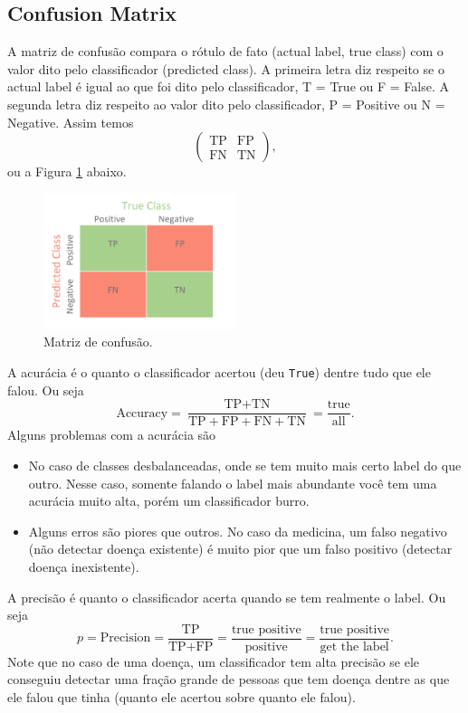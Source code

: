 \documentclass[a4paper,fleqn,12pt]{article}
\begin{document}
\subsection{Confusion Matrix}

A matriz de confusão compara o rótulo de fato (actual label, true class) com o valor dito pelo classificador (predicted class). A primeira letra diz respeito se o actual label é igual ao que foi dito pelo classificador, T = True ou F = False. A segunda letra diz respeito ao valor dito pelo classificador, P = Positive ou N = Negative. Assim temos
$$
\begin{pmatrix}
\text{TP} & \text{FP} \\
\text{FN} & \text{TN}
\end{pmatrix},
$$
ou a Figura \ref{fig:confusion-matrix} abaixo.
\begin{figure}[H]
\centering
\includegraphics[width=0.5\textwidth]{fig/confusion-matrix.png}
\caption{Matriz de confusão.}
\label{fig:confusion-matrix}
\end{figure}

A acurácia é o quanto o classificador acertou (deu \texttt{True}) dentre tudo que ele falou. Ou seja
$$
\text{Accuracy} = \frac{\text{TP}+\text{TN}}{\text{TP}+\text{FP}+\text{FN}+\text{TN}}
= \frac{\text{true}}{\text{all}}.
$$
Alguns problemas com a acurácia são
\begin{itemize}
\item No caso de classes desbalanceadas, onde se tem muito mais certo label do que outro. Nesse caso, somente falando o label mais abundante você tem uma acurácia muito alta, porém um classificador burro.
\item Alguns erros são piores que outros. No caso da medicina, um falso negativo (não detectar doença existente) é muito pior que um falso positivo (detectar doença inexistente).
\end{itemize}

A precisão é quanto o classificador acerta quando se tem realmente o label. Ou seja
$$
p = \text{Precision} = \frac{\text{TP}}{\text{TP}+\text{FP}} = \frac{\text{true positive}}{\text{positive}} = \frac{\text{true positive}}{\text{get the label}}.
$$
Note que no caso de uma doença, um classificador tem alta precisão se ele conseguiu detectar uma fração grande de pessoas que tem doença dentre as que ele falou que tinha (quanto ele acertou sobre quanto ele falou).
\end{document}
